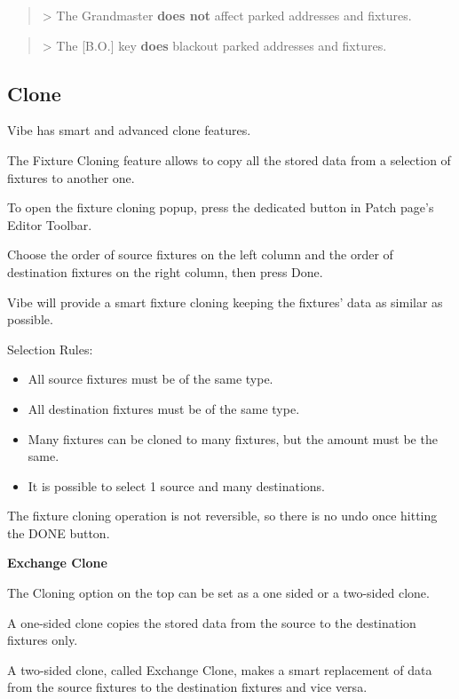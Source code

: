\documentclass[
]{article}
\begin{document}
\begin{quote}
{\textgreater{} The Grandmaster \textbf{does not} affect parked addresses and fixtures. }
\end{quote}

\begin{quote}
{\textgreater{} The {[}B.O.{]} key \textbf{does} blackout parked addresses and fixtures. }
\end{quote}

\hypertarget{Clone-5.8}{%
\subsection{Clone}\label{Clone-5.8}}

Vibe has smart and advanced clone features.

The Fixture Cloning feature allows to copy all the stored data from a selection of fixtures to another one.

To open the fixture cloning popup, press the dedicated button in Patch page's Editor Toolbar.

Choose the order of source fixtures on the left column and the order of destination fixtures on the right column, then press Done.

Vibe will provide a smart fixture cloning keeping the fixtures' data as similar as possible.

Selection Rules:

\begin{itemize}
\item
  All source fixtures must be of the same type.
\item
  All destination fixtures must be of the same type.
\item
  Many fixtures can be cloned to many fixtures, but the amount must be the same.
\item
  It is possible to select 1 source and many destinations.
\end{itemize}

The fixture cloning operation is not reversible, so there is no undo once hitting the DONE button.

\textbf{Exchange Clone}

The Cloning option on the top can be set as a one sided or a two-sided clone.

A one-sided clone copies the stored data from the source to the destination fixtures only.

A two-sided clone, called Exchange Clone, makes a smart replacement of data from the source fixtures to the destination fixtures and vice versa.
\end{document}
